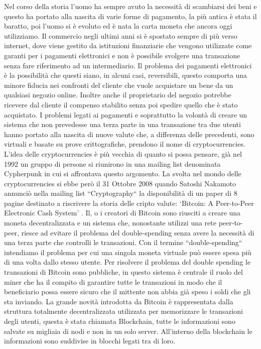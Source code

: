 \documentclass[12pt]{report}
\begin{document}
Nel corso della storia l'uomo ha sempre avuto la necessità di scambiarsi dei beni e questo ha portato alla nascita di varie forme di pagamento, la più antica è stata il baratto, poi l'uomo si è evoluto ed è nata la carta moneta che ancora oggi utilizziamo.
\newline Il commercio negli ultimi anni si è spostato sempre di più verso internet, dove viene gestito da istituzioni finanziarie che vengono utilizzate come garanti per i pagamenti elettronici e non è possibile svolgere una transazione senza fare riferimento ad un intermediario.
\newline Il problema dei pagamenti elettronici è la possibilità che questi siano, in alcuni casi, reversibili, questo comporta una minore fiducia nei confronti del cliente che vuole acquistare un bene da un qualsiasi negozio online.
Inoltre anche il proprietario del negozio potrebbe ricevere dal cliente il compenso stabilito senza poi spedire quello che è stato acquistato.
I problemi legati ai pagamenti e soprattutto la volontà di creare un sistema che non prevedesse una terza parte in una transazione tra due utenti hanno portato alla nascita di nuove valute che, a differenza delle precedenti, sono virtuali e basate su prove crittografiche, prendono il nome di cryptocurrencies.
L'idea delle cryptocurrencies è più vecchia di quanto si possa pensare, già nel 1992 un gruppo di persone si riunirono in una mailing list denominata Cypherpunk \cite{Cypherpunk} in cui si affrontava questo argomento.
\newline
La svolta nel mondo delle cryptocurrencies si ebbe però il 31 Ottobre 2008 quando Satoshi Nakamoto annunciò nella mailing list ``Cryptography`` la disponibilità di un paper di 8 pagine destinato a riscrivere la storia delle cripto valute: ‘Bitcoin: A Peer-to-Peer Electronic Cash System' \cite{BitcoinWhitePaper}.
\newline Il, o i creatori di Bitcoin sono riusciti a creare una moneta decentralizzata e un sistema che, nonostante utilizzi una rete peer-to-peer, riesce ad evitare il problema del double-spending senza avere la necessità di una terza parte che controlli le transazioni.
\newline Con il termine ``double-spending`` intendiamo il problema per cui una singola moneta virtuale può essere spesa più di una volta dallo stesso utente.
Per risolvere il problema del double spending le transazioni di Bitcoin sono pubbliche, in questo sistema è centrale il ruolo del miner che ha il compito di garantire tutte le transazioni in modo che il beneficiario possa essere sicuro che il mittente non abbia già speso i soldi che gli sta inviando.
La grande novità introdotta da Bitcoin è rappresentata dalla struttura totalmente decentralizzata utilizzata per memorizzare le transazioni degli utenti, questa è stata chiamata Blockchain, tutte le informazioni sono salvate su migliaia di nodi e non in un solo server.
All'interno della blockchain le informazioni sono suddivise in blocchi legati tra di loro.
\end{document}
